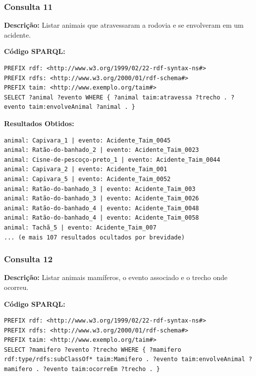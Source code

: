 \documentclass[12pt,a4paper]{article}
\begin{document}
\vspace{1cm}
\subsubsection*{Consulta 11}

\textbf{Descrição:} Listar animais que atravessaram a rodovia e se envolveram em um acidente.

\textbf{Código SPARQL:}
\begin{lstlisting}
PREFIX rdf: <http://www.w3.org/1999/02/22-rdf-syntax-ns#>
PREFIX rdfs: <http://www.w3.org/2000/01/rdf-schema#>
PREFIX taim: <http://www.exemplo.org/taim#>
SELECT ?animal ?evento WHERE { ?animal taim:atravessa ?trecho . ?evento taim:envolveAnimal ?animal . }
\end{lstlisting}

\textbf{Resultados Obtidos:}
\begin{lstlisting}
animal: Capivara_1 | evento: Acidente_Taim_0045
animal: Ratão-do-banhado_2 | evento: Acidente_Taim_0023
animal: Cisne-de-pescoço-preto_1 | evento: Acidente_Taim_0044
animal: Capivara_2 | evento: Acidente_Taim_001
animal: Capivara_5 | evento: Acidente_Taim_0052
animal: Ratão-do-banhado_3 | evento: Acidente_Taim_003
animal: Ratão-do-banhado_3 | evento: Acidente_Taim_0026
animal: Ratão-do-banhado_4 | evento: Acidente_Taim_0048
animal: Ratão-do-banhado_4 | evento: Acidente_Taim_0058
animal: Tachã_5 | evento: Acidente_Taim_007
... (e mais 107 resultados ocultados por brevidade)
\end{lstlisting}

\vspace{1cm}
\subsubsection*{Consulta 12}

\textbf{Descrição:} Listar animais mamíferos, o evento associado e o trecho onde ocorreu.

\textbf{Código SPARQL:}
\begin{lstlisting}
PREFIX rdf: <http://www.w3.org/1999/02/22-rdf-syntax-ns#>
PREFIX rdfs: <http://www.w3.org/2000/01/rdf-schema#>
PREFIX taim: <http://www.exemplo.org/taim#>
SELECT ?mamifero ?evento ?trecho WHERE { ?mamifero rdf:type/rdfs:subClassOf* taim:Mamifero . ?evento taim:envolveAnimal ?mamifero . ?evento taim:ocorreEm ?trecho . }
\end{lstlisting}
\end{document}
